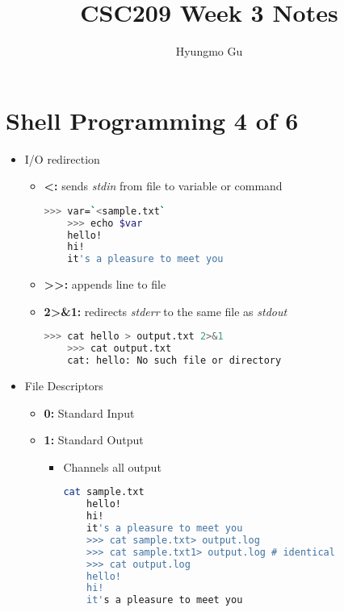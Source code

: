 \documentclass[12pt]{article}
\begin{document}
\title{CSC209 Week 3 Notes}
\author{Hyungmo Gu}
\maketitle

\section*{Shell Programming 4 of 6}

\bigskip

\begin{itemize}
    \item I/O redirection
    \begin{itemize}
    \item \textbf{\textless:} sends \textit{stdin} from file to variable or command
    \begin{lstlisting}[language=bash]
    >>> var=`<sample.txt`
    >>> echo $var
    hello!
    hi!
    it's a pleasure to meet you
    \end{lstlisting}

    \item \textbf{\textgreater\textgreater:} appends line to file\
    \item \textbf{2\textgreater\&1:} redirects \textit{stderr} to the same file as \textit{stdout}

    \begin{lstlisting}[language=bash]
    >>> cat hello > output.txt 2>&1
    >>> cat output.txt
    cat: hello: No such file or directory
    \end{lstlisting}

    \end{itemize}
    \item File Descriptors
    \begin{itemize}
    \item \textbf{0:} Standard Input
    \item \textbf{1:} Standard Output
    \begin{itemize}
    \item Channels all output

    \begin{lstlisting}[language=bash]
    cat sample.txt
    hello!
    hi!
    it's a pleasure to meet you
    >>> cat sample.txt> output.log
    >>> cat sample.txt1> output.log # identical
    >>> cat output.log
    hello!
    hi!
    it's a pleasure to meet you
    \end{lstlisting}
    \end{itemize}


\end{itemize}
\end{itemize}
\end{document}
